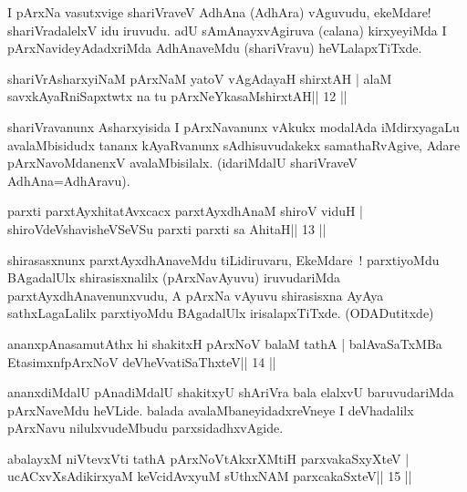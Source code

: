\begin{artha}
I pArxNa vasutxvige shariVraveV AdhAna (AdhAra) vAguvudu, ekeMdare! shariVradalelxV idu iruvudu. adU sAmAnayxvAgiruva (calana) kirxyeyiMda I pArxNavideyAdadxriMda AdhAnaveMdu (shariVravu) heVLalapxTiTxde.
\end{artha}

\begin{shl}
shariVrAsharxyiNaM pArxNaM yatoV vAgAdayaH shirxtAH |
alaM savxkAyaRniSapxtwtx na tu pArxNeYkasaMshirxtAH\hfill || 12 ||
\end{shl}

\begin{artha}
shariVravanunx Asharxyisida I pArxNavanunx vAkukx modalAda iMdirxyagaLu avalaMbisidudx tananx kAyaRvanunx sAdhisuvudakekx samathaRvAgive, Adare pArxNavoMdanenxV avalaMbisilalx. (idariMdalU shariVraveV AdhAna=AdhAravu).
\end{artha}



\begin{shl}
parxti parxtAyxhitatAvxcacx parxtAyxdhAnaM shiroV viduH |
shiroVdeVshavisheVSeVSu parxti parxti sa AhitaH\hfill || 13 ||
\end{shl}

\begin{artha}
shirasasxnunx parxtAyxdhAnaveMdu tiLidiruvaru, EkeMdare~! parxtiyoMdu
BAgadalUlx shirasisxnalilx (pArxNavAyuvu) iruvudariMda
parxtAyxdhAnavenunxvudu, A pArxNa vAyuvu shirasisxna AyAya
sathxLagaLalilx parxtiyoMdu BAgadalUlx irisalapxTiTxde. (ODADutitxde)
\end{artha}



\begin{shl}
ananxpAnasamutAthx hi shakitxH pArxNoV balaM tathA |
balAvaSaTxMBa EtasimxnfpArxNoV deVheV\s vatiSaThxteV\hfill || 14 ||
\end{shl}

\begin{artha}
ananxdiMdalU pAnadiMdalU shakitxyU shAriVra bala elalxvU baruvudariMda pArxNaveMdu heVLide. balada avalaMbaneyidadxreVneye I deVhadalilx pArxNavu nilulxvudeMbudu parxsidadhxvAgide.
\end{artha}



\begin{shl}
abalayxM niVtevxVti tathA pArxNoVtAkxrXMtiH parxvakaSxyXteV |
ucACxvXsAdikirxyaM keVcidAvxyuM sUthxNAM parxcakaSxteV\hfill || 15 ||
\end{shl}

